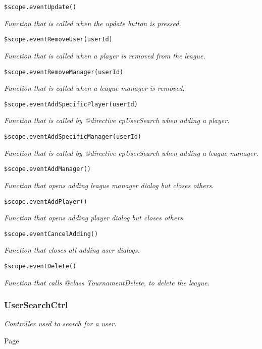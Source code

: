 \texttt{\$scope.eventUpdate()}

{\scriptsize
\textit{Function that is called when the update button is pressed.}

}

\texttt{\$scope.eventRemoveUser(userId)}

{\scriptsize
\textit{Function that is called when a player is removed from the league.}

}

\texttt{\$scope.eventRemoveManager(userId)}

{\scriptsize
\textit{Function that is called when a league manager is removed.}

}

\texttt{\$scope.eventAddSpecificPlayer(userId)}

{\scriptsize
\textit{Function that is called by @directive cpUserSearch when adding a player.}

}

\texttt{\$scope.eventAddSpecificManager(userId)}

{\scriptsize
\textit{Function that is called by @directive cpUserSearch when adding a league manager.}

}

\texttt{\$scope.eventAddManager()}

{\scriptsize
\textit{Function that opens adding league manager dialog but closes others.}

}

\texttt{\$scope.eventAddPlayer()}

{\scriptsize
\textit{Function that opens adding player dialog but closes others.}

}

\texttt{\$scope.eventCancelAdding()}

{\scriptsize
\textit{Function that closes all adding user dialogs.}

}

\texttt{\$scope.eventDelete()}

{\scriptsize
\textit{Function that calls @class TournamentDelete, to delete the league.}

}

\subsubsection{UserSearchCtrl}
\textit{Controller used to search for a user.}

Page \pageref{UserSearchCtrl.js}

